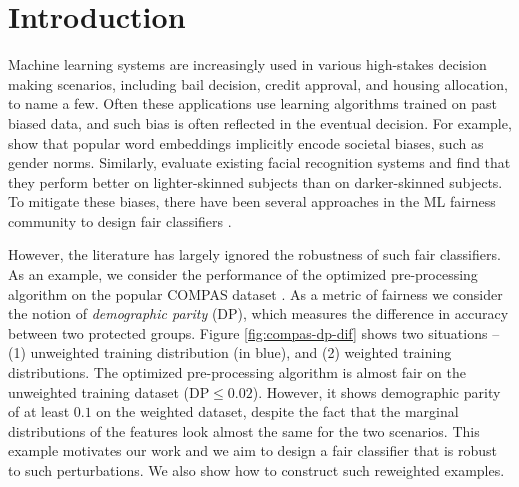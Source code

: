\documentclass{article}
\newcommand{\kibitz}[2]{\ifnum\Comments=1{\color{#1}{#2}}\fi}
\newcommand{\dm}[1]{\kibitz{magenta}{[Deb: #1]}}
\begin{document}
\section{Introduction}
Machine learning systems are increasingly used in various high-stakes decision making scenarios, including bail decision, credit approval, and housing allocation, to name a few. Often these applications use learning algorithms trained on past biased data, and such bias is often reflected in the eventual decision. For example, \cite{BCZS+16} show that popular word embeddings implicitly encode societal biases, such as gender norms. Similarly, \cite{BG18} evaluate existing facial recognition systems and find that they perform better on lighter-skinned subjects  than on darker-skinned subjects. To mitigate these biases, there have been several approaches in the ML fairness community to design fair classifiers \cite{ZWSP+13,HPS16,ABDL+18}. 

However, the literature has largely ignored the robustness of such fair classifiers. As an example, we consider the performance of the optimized pre-processing algorithm \cite{CWVN+17} on the popular COMPAS dataset \cite{COMPAS}. As a metric of fairness we consider the notion of \emph{demographic parity} (DP), which measures the difference in accuracy between two protected groups. Figure \ref{fig:compas-dp-dif} shows two situations -- (1) unweighted training distribution (in blue), and (2) weighted training distributions. The optimized pre-processing algorithm \cite{CWVN+17} is almost fair on the unweighted training dataset ($\textrm{DP} \leq 0.02$). However, it shows demographic parity of at least $0.1$ on the weighted dataset, despite the fact that the marginal distributions of the features look almost the same for the two scenarios. This example motivates our work and we aim to design a fair classifier that is robust to such perturbations. We also show how to construct such reweighted examples.
\end{document}
